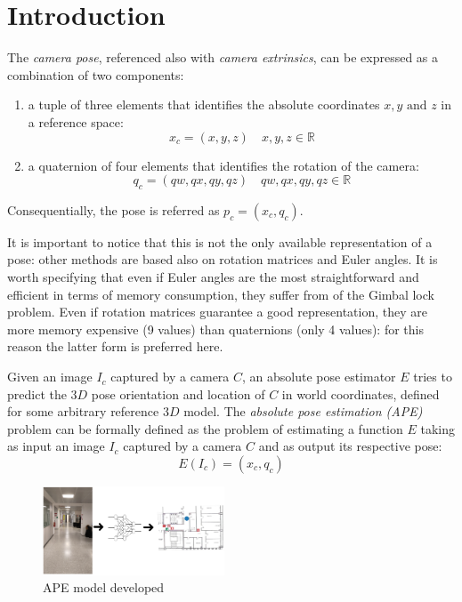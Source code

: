 \section{Introduction}
The \emph{camera pose}, referenced also with \emph{camera extrinsics}, can be expressed as a combination of two components:
\begin{enumerate}
    \item a tuple of three elements that identifies the absolute coordinates $x,y\text{ and }z$ in a reference space:
          \begin{equation}
              x_c=(x,y,z)\quad x,y,z \in \mathbb{R}
              \label{eq:absolute-position-definition}
          \end{equation}
    \item a quaternion of four elements that identifies the rotation of the camera:
          \begin{equation}
              q_c=(qw, qx, qy, qz)\quad qw,qx,qy,qz \in \mathbb{R}
              \label{eq:quaternion-as-rotation-definition}
          \end{equation}

\end{enumerate}
Consequentially, the pose is referred as $p_c=(x_c, q_c)$.

It is important to notice that this is not the only available representation of a pose: other methods are based also on rotation matrices and Euler angles. It is worth specifying that even if Euler angles are the most straightforward and efficient in terms of memory consumption, they suffer from of the Gimbal lock problem. Even if rotation matrices guarantee a good representation, they are more memory expensive (9 values) than quaternions (only 4 values): for this reason the latter form is preferred here.

Given an image $I_c$ captured by a camera $C$, an absolute pose estimator $E$ tries to predict the $3D$ pose orientation and location of $C$ in world coordinates, defined for some arbitrary reference $3D$ model. The \emph{absolute pose estimation (APE)} problem can be formally defined as the problem of estimating a function $E$ taking as input an image $I_c$ captured by a camera $C$ and as output its respective pose:
\begin{equation}
    E(I_c) = (x_c, q_c)
    \label{eq:absolute-pose-estimation-task}
\end{equation}

\begin{figure}[h]
    \begin{center}
        \includegraphics[width=0.48\textwidth]{./imgs/introduction_example.png}
    \end{center}
    \caption{APE model developed}
    \label{fig:introduction-example}
\end{figure}


